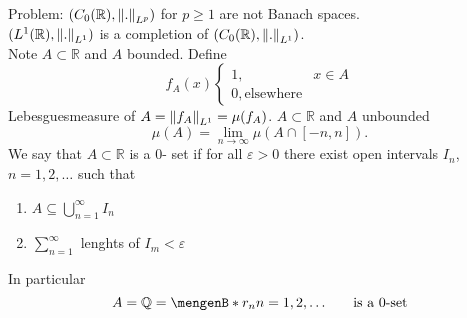 \begin{bemerkung}
\begin{itemize}
		Problem: $(C_0(\mathbb{R}), \norm{.}_{L^p})$ for $p \geq 1$ are not Banach spaces. \\
		$(L^1(\mathbb{R}),\norm{.}_{L^1})$ is a completion of $(C_0(\mathbb{R}),\norm{.}_{L^1})$. \\
		Note $A \subset \mathbb{R}$ and $A$ bounded. Define
		\[
			f_A(x) \begin{cases}
				1, & x \in A\\
				0, \text{elsewhere}
			\end{cases}
		\]
		Lebesguesmeasure of $A = \norm{f_A}_{L^1} = \mu(f_A)$. $A \subset \mathbb{R}$ and $A$ unbounded
		\[
			\mu(A) = \lim_{n \to \infty} \mu ( A \cap [-n,n]).
		\]
		We say that $A \subset \mathbb{R}$ is a $0$- set if for all $\varepsilon >0$ there exist open intervals $I_n$, $n=1,2, \dots$ such that
		\begin{enumerate}[(1)]
			\item $ A \subseteq \bigcup_{n=1}^{\infty}I_n$
			\item $\sum_{n=1}^{\infty}$ lenghts of $I_m < \varepsilon$
		\end{enumerate} 
		In particular
		\[
			A = \mathbb{Q} = \set[r_n]{n=1,2,\dots}\qquad \text{is a $0$-set}	
		\]
	\end{itemize}
\end{bemerkung}